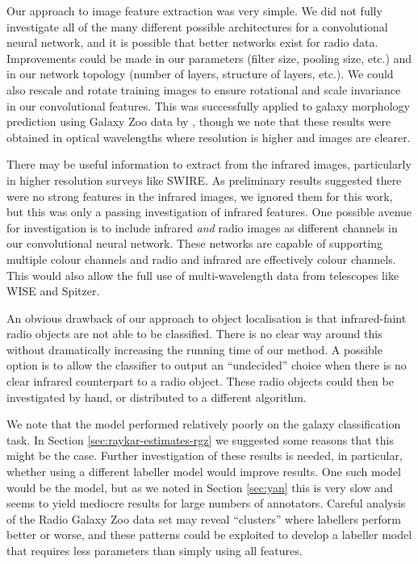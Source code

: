   Our approach to image feature extraction was very simple. We did not fully
  investigate all of the many different possible architectures for a
  convolutional neural network, and it is possible that better networks exist
  for radio data. Improvements could be made in our parameters (filter size,
  pooling size, etc.) and in our network topology (number of layers, structure
  of layers, etc.). We could also rescale and rotate training images to ensure
  rotational and scale invariance in our convolutional features. This was
  successfully applied to galaxy morphology prediction using Galaxy Zoo data by
  \citet{dieleman15}, though we note that these results were obtained in optical
  wavelengths where resolution is higher and images are clearer.

  There may be useful information to extract from the infrared images,
  particularly in higher resolution surveys like SWIRE. As preliminary results
  suggested there were no strong features in the infrared images, we ignored
  them for this work, but this was only a passing investigation of infrared
  features. One possible avenue for investigation is to include infrared
  \emph{and} radio images as different channels in our convolutional neural
  network. These networks are capable of supporting multiple colour channels and
  radio and infrared are effectively colour channels. This would also allow the
  full use of multi-wavelength data from telescopes like WISE and Spitzer.

  An obvious drawback of our approach to object localisation is that
  infrared-faint radio objects are not able to be classified. There is no clear
  way around this without dramatically increasing the running time of our
  method. A possible option is to allow the classifier to output an
  ``undecided'' choice when there is no clear infrared counterpart to a radio
  object. These radio objects could then be investigated by hand, or distributed
  to a different algorithm.

  We note that the \citeauthor{raykar10} model performed relatively poorly on
  the galaxy classification task. In Section \ref{sec:raykar-estimates-rgz} we
  suggested some reasons that this might be the case. Further investigation of
  these results is needed, in particular, whether using a different labeller
  model would improve results. One such model would be the \citeauthor{yan10}
  model, but as we noted in Section \ref{sec:yan} this is very slow and seems to
  yield mediocre results for large numbers of annotators. Careful analysis of
  the Radio Galaxy Zoo data set may reveal ``clusters'' where labellers perform
  better or worse, and these patterns could be exploited to develop a labeller
  model that requires less parameters than simply using all features.


